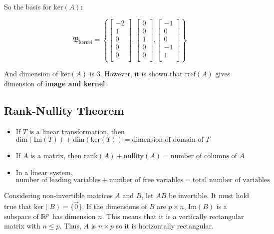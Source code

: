 So the basis for $\mathrm{ker}(A)$:

\[\mathfrak{B}_\mathrm{kernel}=\left\{\begin{bmatrix}-2\\1\\0\\0\\0\\ \end{bmatrix}, \begin{bmatrix} 0\\0\\1\\0\\0\\ \end{bmatrix}, \begin{bmatrix}-1\\0\\0\\-1\\1\\ \end{bmatrix} \right\}\]

And dimension of $\mathrm{ker}(A)$ is 3.
However, it is shown that $\mathrm{rref}(A)$ gives dimension of \textbf{image and kernel}.

\subsection{Rank-Nullity Theorem}

\begin{framed}
    \begin{itemize}
        \item If $T$ is a linear transformation, 
        then \\$\mathrm{dim}(\mathrm{Im}(T))+\mathrm{dim}(\mathrm{ker}(T))=\text{dimension of domain of }T$
        \item If $A$ is a matrix, then $\mathrm{rank}(A)+\mathrm{nullity}(A)=\text{number of columns of }A$
        \item In a linear system, 
        \\$\text{number of leading variables}+\text{number of free variables}=\text{total number of variables}$
    \end{itemize}
\end{framed}

Considering non-invertible matrices $A$ and $B$, let $AB$ be invertible.
It must hold true that $\mathrm{ker}(B)=\{\vec{0}\}$. If the dimensions of $B$ are $p\times n$,
$\mathrm{Im}(B)$ is a subspace of $\mathbb{R}^p$ has dimension $n$. This means that it is a vertically rectangular
matrix with $n\leq p$. Thus, $A$ is $n\times p$ so it is horizontally rectangular.